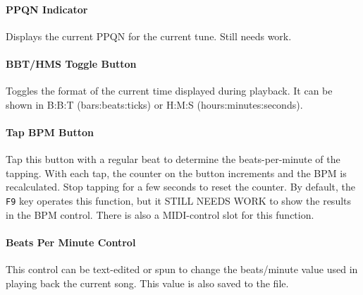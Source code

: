 \documentclass[
 11pt,
 twoside,
 a4paper,
 headinclude,
 footinclude,
 final                                 %
]{article}
\begin{document}
\paragraph{PPQN Indicator}
\label{paragraph:introduction_ppqn_indicator}

   Displays the current PPQN for the current tune.
   Still needs work.


\paragraph{BBT/HMS Toggle Button}
\label{paragraph:introduction_time_format_toggle_button}

   Toggles the format of the current time displayed during playback. 
   It can be shown in B:B:T (bars:beats:ticks) or H:M:S (hours:minutes:seconds).

\paragraph{Tap BPM Button}
\label{paragraph:introduction_tap_bpm_button}

   Tap this button with a regular beat to determine the beats-per-minute of the
   tapping.  With each tap, the counter on the button increments and the BPM is
   recalculated.  Stop tapping for a few seconds to reset the counter.
   By default, the \texttt{F9} key operates this function, but it
   STILL NEEDS WORK to show the results in the BPM control.
   There is also a MIDI-control slot for this function.

\paragraph{Beats Per Minute Control}
\label{paragraph:introduction_bpm_control}

   This control can be text-edited or spun to change the beats/minute value
   used in playing back the current song.  This value is also saved to the
   file.





\end{document}
